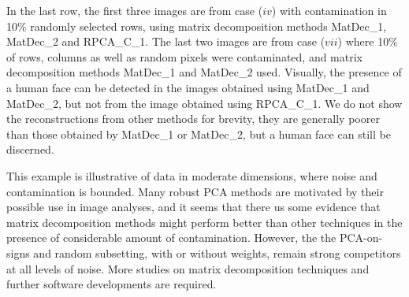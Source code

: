 \documentclass[ss]{imsart}
\theoremstyle{Example}
\begin{document}
 In the last row, the first three images are from case ($iv$) with contamination in 10\% randomly selected rows, using matrix decomposition methods MatDec\_1, MatDec\_2 and RPCA\_C\_1.  The last two images are from case ($vii$) where 10\% of rows, columns as well as random pixels were contaminated, and matrix decomposition methods MatDec\_1 and MatDec\_2 used. Visually, the presence of a human face can be detected in the images obtained using MatDec\_1 and MatDec\_2, but not from the image obtained using RPCA\_C\_1.
  We do not show the reconstructions from other methods for brevity, they are generally poorer than those obtained by MatDec\_1 or MatDec\_2, but a human face can still be discerned. 

This example is illustrative of data in moderate dimensions, where noise and contamination is bounded. Many robust PCA methods are motivated by their possible use in image analyses, and it seems that there us some evidence that matrix decomposition methods might perform better than other techniques in the presence of considerable amount of contamination. However, the the PCA-on-signs and random subsetting, with or without weights, remain strong competitors at all levels of noise. More studies on matrix decomposition techniques and further software developments are required.

\clearpage
\end{document}
